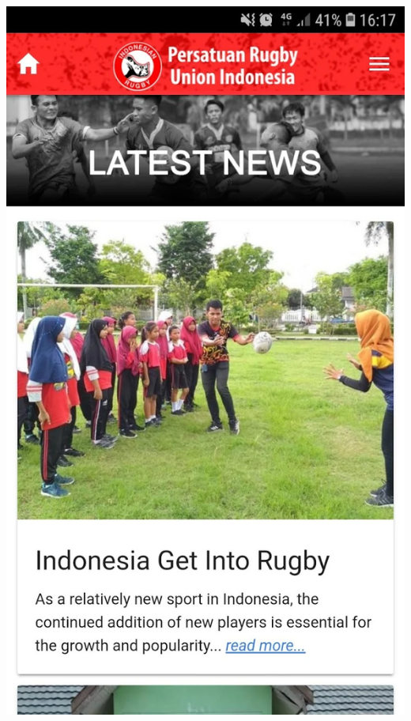 \documentclass[a4paper,twoside]{article}
\begin{document}
\includegraphics[scale=0.125]{latest_news.png} \hspace{0.5cm}
\end{document}
